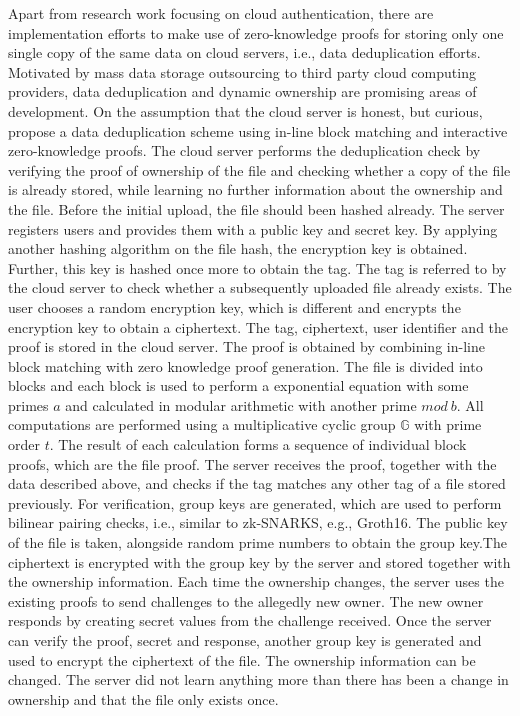 Apart from research work focusing on cloud authentication, there are implementation efforts to make use of zero-knowledge proofs for storing only one single copy of the same data on cloud servers, i.e., data deduplication efforts. Motivated by mass data storage outsourcing to third party cloud computing providers, data deduplication and dynamic ownership are promising areas of development. On the assumption that the cloud server is honest, but curious, \citet{Kanagamani} propose a data deduplication scheme using in-line block matching and interactive zero-knowledge proofs. The cloud server performs the deduplication check by verifying the proof of ownership of the file and checking whether a copy of the file is already stored, while learning no further information about the ownership and the file. Before the initial upload, the file should been hashed already. The server registers users and provides them with a public key and secret key. By applying another hashing algorithm on the file hash, the encryption key is obtained. Further, this key is hashed once more to obtain the tag. The tag is referred to by the cloud server to check whether a subsequently uploaded file already exists. The user chooses a random encryption key, which is different and encrypts the encryption key to obtain a ciphertext. The tag, ciphertext, user identifier and the proof is stored in the cloud server. The proof is obtained by combining in-line block matching with zero knowledge proof generation. The file is divided into blocks and each block is used to perform a exponential equation with some primes \(a\) and calculated in modular arithmetic with another prime \(mod \ b\). All computations are performed using a multiplicative cyclic group \begin{math} \mathbb{G} \end{math} with prime order \(t\). The result of each calculation forms a sequence of individual block proofs, which are the file proof. The server receives the proof, together with the data described above, and checks if the tag matches any other tag of a file stored previously. For verification, group keys are generated, which are used to perform bilinear pairing checks, i.e., similar to zk-SNARKS, e.g., Groth16. The public key of the file is taken, alongside random prime numbers to obtain the group key.The ciphertext is encrypted with the group key by the server and stored together with the ownership information. Each time the ownership changes, the server uses the existing proofs to send challenges to the allegedly new owner. The new owner responds by creating secret values from the challenge received. Once the server can verify the proof, secret and response, another group key is generated and used to encrypt the ciphertext of the file. The ownership information can be changed. The server did not learn anything more than there has been a change in ownership and that the file only exists once. 

